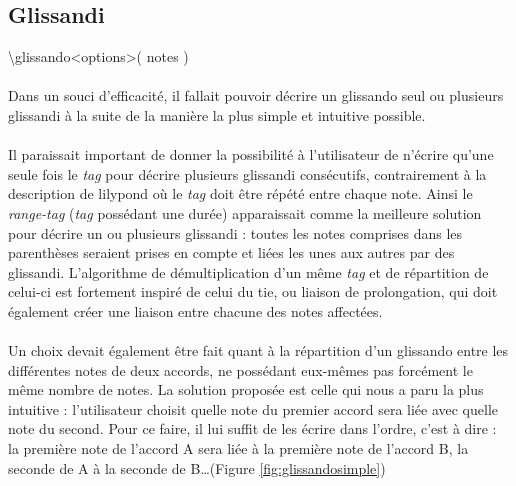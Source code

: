 \documentclass[a4paper,10pt,twocolumn]{article}
\newenvironment{code}
  {\fontfamily{pnc}\selectfont}{}
\begin{document}
\subsection{Glissandi}

\begin{code}
\textbackslash{}glissando\textless{}options\textgreater{}( notes )
\end{code}
\\

\paragraph{}
Dans un souci d'efficacité, il fallait pouvoir décrire un glissando seul ou plusieurs glissandi à la suite de la manière la plus simple et intuitive possible. 

\paragraph{}
Il paraissait important de donner la possibilité à l'utilisateur de n'écrire qu'une seule fois le \emph{tag} pour décrire plusieurs glissandi consécutifs, contrairement à la description de lilypond où le \emph{tag} doit être répété entre chaque note. Ainsi le \emph{range-tag} (\emph{tag} possédant une durée) apparaissait comme la meilleure solution pour décrire un ou plusieurs glissandi : toutes les notes comprises dans les parenthèses seraient prises en compte et liées les unes aux autres par des glissandi. L'algorithme de démultiplication d'un même \emph{tag} et de répartition de celui-ci est fortement inspiré de celui du tie, ou liaison de prolongation, qui doit également créer une liaison entre chacune des notes affectées.

\paragraph{}
Un choix devait également être fait quant à la répartition d'un glissando entre les différentes notes de deux accords, ne possédant eux-mêmes pas forcément le même nombre de notes. La solution proposée est celle qui nous a paru la plus intuitive : l'utilisateur choisit quelle note du premier accord sera liée avec quelle note du second. Pour ce faire, il lui suffit de les écrire dans l'ordre, c'est à dire : la première note de l'accord A sera liée à la première note de l'accord B, la seconde de A à la seconde de B\dots (Figure \ref{fig:glissandosimple})
\end{document}
